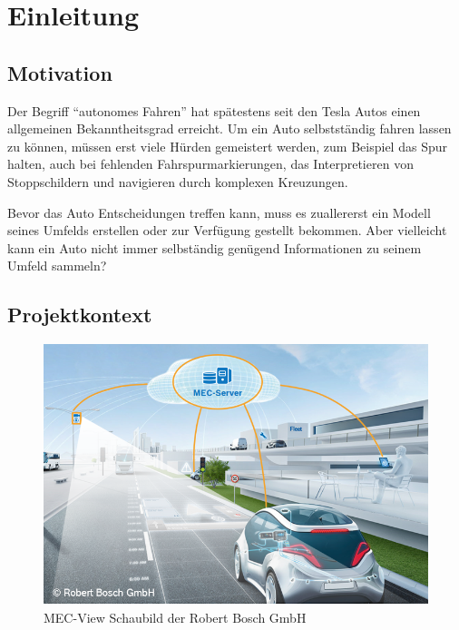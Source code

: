 
\chapter{Einleitung}

\section{Motivation}
Der Begriff \enquote{autonomes Fahren} hat spätestens seit den Tesla Autos einen allgemeinen Bekanntheitsgrad erreicht. Um ein Auto selbstständig fahren lassen zu können, müssen erst viele Hürden gemeistert werden, zum Beispiel das Spur halten, auch bei fehlenden Fahrspurmarkierungen, das Interpretieren von Stoppschildern und navigieren durch komplexen Kreuzungen. 

Bevor das Auto Entscheidungen treffen kann, muss es zuallererst ein Modell seines Umfelds erstellen oder zur Verfügung gestellt bekommen. Aber vielleicht kann ein Auto nicht immer selbständig genügend Informationen zu seinem Umfeld sammeln? 

\section{Projektkontext}
\begin{figure}[H]
	\label{test 123}
	\centering
	\includegraphics[width=\textwidth]{images/MECView_Schaubild_BoschStyle_V2.png}
	\caption{MEC-View Schaubild der Robert Bosch GmbH \cite{mec:home} {}}
\end{figure}

